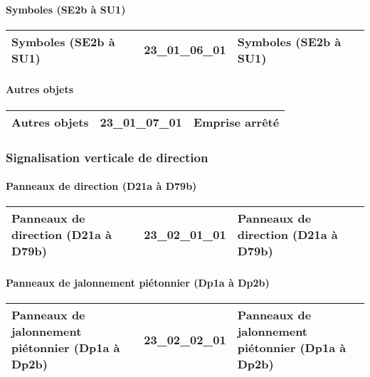 \documentclass[12pt,titlepage]{book}
\begin{document}
\paragraph{Symboles (SE2b à SU1)}
\noindent
\vspace{\baselineskip}

\renewcommand{\arraystretch}{1.2}
\begin{supertabular}{|p{10cm}|c|p{15cm}|}
 Symboles (SE2b à SU1) & 23\_01\_06\_01 & Symboles (SE2b à SU1)\\
\hline
\end{supertabular}


\paragraph{Autres objets}
\noindent
\vspace{\baselineskip}

\renewcommand{\arraystretch}{1.2}
\begin{supertabular}{|p{10cm}|c|p{15cm}|}
 Autres objets & 23\_01\_07\_01 & Emprise arrêté\\
\hline
\end{supertabular}

\subsubsection{\large Signalisation verticale de direction}
\paragraph{Panneaux de direction (D21a à D79b)}
\noindent
\vspace{\baselineskip}

\renewcommand{\arraystretch}{1.2}
\begin{supertabular}{|p{10cm}|c|p{15cm}|}
 Panneaux de direction (D21a à D79b) & 23\_02\_01\_01 & Panneaux de direction (D21a à D79b)\\
\hline
\end{supertabular}


\paragraph{Panneaux de jalonnement piétonnier (Dp1a à Dp2b)}
\noindent
\vspace{\baselineskip}

\renewcommand{\arraystretch}{1.2}
\begin{supertabular}{|p{10cm}|c|p{15cm}|}
 Panneaux de jalonnement piétonnier (Dp1a à Dp2b) & 23\_02\_02\_01 & Panneaux de jalonnement piétonnier (Dp1a à Dp2b)\\
\hline
\end{supertabular}
\end{document}
